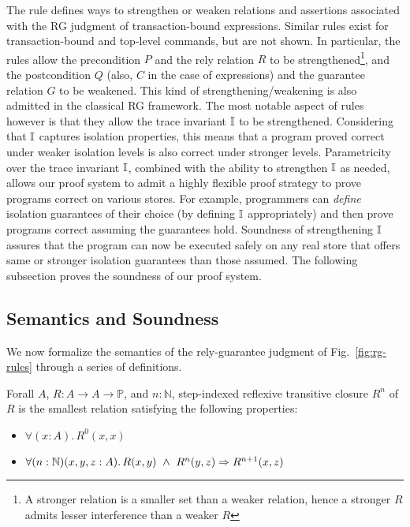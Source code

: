 The  rule defines ways to strengthen or weaken
relations and assertions associated with the RG judgment of
transaction-bound expressions. Similar rules exist for
transaction-bound and top-level commands, but are not shown. In
particular, the rules allow the precondition $P$ and the rely relation
$R$ to be strengthened\footnote{A stronger relation is a smaller set
than a weaker relation, hence a stronger $R$ admits lesser
interference than a weaker $R$}, and the postcondition $Q$ (also, $C$
in the case of expressions) and the guarantee relation $G$ to be
weakened. This kind of strengthening/weakening is also admitted in the
classical RG framework. The most notable aspect of
 rules however is that they allow the trace
invariant $\mathbb{I}$ to be strengthened. Considering that $\mathbb{I}$ captures
isolation properties, this means that a program proved correct under
weaker isolation levels is also correct under stronger levels.
Parametricity over the trace invariant $\mathbb{I}$, combined with the ability
to strengthen $\mathbb{I}$ as needed, allows our proof system to admit a
highly flexible proof strategy to prove programs correct on various
stores. For example, programmers can \emph{define} isolation
guarantees of their choice (by defining $\mathbb{I}$ appropriately) and then
prove programs correct assuming the guarantees hold. Soundness of
strengthening $\mathbb{I}$ assures that the program can now be executed safely
on any real store that offers same or stronger isolation guarantees
than those assumed. The following subsection proves the soundness of
our proof system.

\subsection{Semantics and Soundness}

We now formalize the semantics of the rely-guarantee judgment of
Fig.~\ref{fig:rg-rules} through a series of definitions.

\begin{definition}
Forall $A$, $R: A \rightarrow A \rightarrow \mathbb{P}$, and $n :
\mathbb{N}$, step-indexed reflexive transitive closure $R^n$ of $R$ is
the smallest relation satisfying the following
properties:
\begin{itemize}
\item $\forall (x:A).\, R^0 (x,x)$
\item $\forall (n:\mathbb{N})(x,y,z : A).\, R(x,y) ~\wedge~ R^n(y,z) \Rightarrow
R^{n+1}(x,z)$
\end{itemize}
\end{definition}

